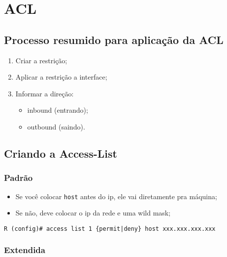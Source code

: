 \documentclass[]{article}
\date{}
\begin{document}
{
\hypersetup{linkcolor=black}
\setcounter{tocdepth}{3}
\tableofcontents
}
\section{ACL}\label{acl}

\subsection{Processo resumido para aplicação da
ACL}\label{processo-resumido-para-aplicauxe7uxe3o-da-acl}

\begin{enumerate}
\def\labelenumi{\arabic{enumi}.}
\item
  Criar a restrição;
\item
  Aplicar a restrição a interface;
\item
  Informar a direção:

  \begin{itemize}
  \itemsep1pt\parskip0pt
  \item
    inbound (entrando);
  \item
    outbound (saindo).
  \end{itemize}
\end{enumerate}

\subsection{Criando a Access-List}\label{criando-a-access-list}

\subsubsection{Padrão}\label{padruxe3o}

\begin{itemize}
\item
  Se você colocar \texttt{host} antes do ip, ele vai diretamente pra
  máquina;
\item
  Se não, deve colocar o ip da rede e uma wild mask;
\end{itemize}

\begin{verbatim}
R (config)# access list 1 {permit|deny} host xxx.xxx.xxx.xxx
\end{verbatim}

\subsubsection{Extendida}\label{extendida}
\end{document}
